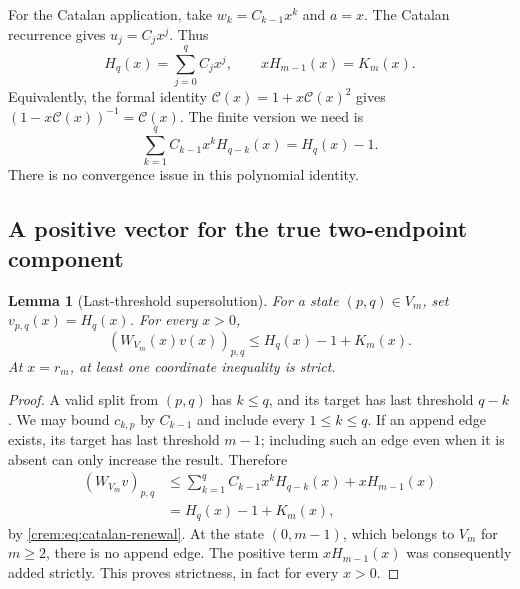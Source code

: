 \documentclass[11pt,a4paper]{article}
\newtheorem{lemma}[lemma]{Lemma}
\theoremstyle{definition}\newaliascnt{definition}{theorem}
\theoremstyle{remark}\newaliascnt{remark}{theorem}
\newcommand{\Cat}{\mathcal C}
\begin{document}
For the Catalan application, take $w_k=C_{k-1}x^k$ and $a=x$. The Catalan
recurrence gives $u_j=C_jx^j$. Thus
\begin{equation}
 H_q(x)=\sum_{j=0}^q C_jx^j,
 \qquad xH_{m-1}(x)=K_m(x).
 \label{crem:eq:H}
\end{equation}
Equivalently, the formal identity $\Cat(x)=1+x\Cat(x)^2$ gives
$(1-x\Cat(x))^{-1}=\Cat(x)$. The finite version we need is
\begin{equation}
 \sum_{k=1}^q C_{k-1}x^kH_{q-k}(x)=H_q(x)-1.
 \label{crem:eq:catalan-renewal}
\end{equation}
There is no convergence issue in this polynomial identity.

\subsection{A positive vector for the true two-endpoint component}
\begin{lemma}[Last-threshold supersolution]\label{crem:lem:V-vector}
For a state $(p,q)\in V_m$, set $v_{p,q}(x)=H_q(x)$. For every $x>0$,
\begin{equation}
 (W_{V_m}(x)v(x))_{p,q}
 \le H_q(x)-1+K_m(x).
 \label{crem:eq:V-domination}
\end{equation}
At $x=r_m$, at least one coordinate inequality is strict.
\end{lemma}
\begin{proof}
A valid split from $(p,q)$ has $k\le q$, and its target has last threshold
$q-k$. We may bound $c_{k,p}$ by $C_{k-1}$ and include every $1\le k\le q$.
If an append edge exists, its target has last threshold $m-1$; including
such an edge even when it is absent can only increase the result. Therefore
\begin{align*}
 (W_{V_m}v)_{p,q}
 &\le\sum_{k=1}^q C_{k-1}x^kH_{q-k}(x)+xH_{m-1}(x)\\
 &=H_q(x)-1+K_m(x),
\end{align*}
by \eqref{crem:eq:catalan-renewal}. At the state $(0,m-1)$, which belongs to
$V_m$ for $m\ge2$, there is no append edge. The positive term
$xH_{m-1}(x)$ was consequently added strictly. This proves strictness, in
fact for every $x>0$.
\end{proof}
\end{document}
